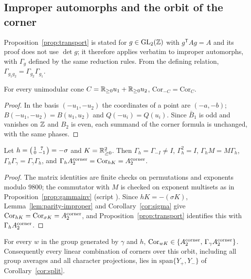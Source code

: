 \subsection{Improper automorphs and the orbit of the corner}\label{sec:improper}
Proposition~\ref{prop:transport} is stated for $g\in\mathrm{GL}_2(\mathbb{Z})$ with $g^{\mathsf T}Ag=A$ and its proof does not use $\det g$; it therefore applies verbatim to improper automorphs, with
$\Gamma_g$ defined by the same reduction rules. From the defining relation, $\Gamma_{g_1g_2}=\Gamma_{g_2}\Gamma_{g_1}$.
\begin{lemma}\label{lem:parity-improper}
For every unimodular cone $C=\mathbb{R}_{\ge0}u_1+\mathbb{R}_{\ge0}u_2$, $\mathrm{Cor}_{-C}=\mathrm{Cor}_C$.
\end{lemma}
\begin{proof}
In the basis $(-u_1,-u_2)$ the coordinates of a point are $(-a,-b)$; $B(-u_1,-u_2)=B(u_1,u_2)$ and $Q(-u_i)=Q(u_i)$. Since $\bar B_1$ is odd and vanishes on $\mathbb{Z}$ and $B_2$ is even, each
summand of the corner formula is unchanged, with the same phases.
\end{proof}
\begin{proposition}\label{prop:improper}
Let $h=\begin{psmallmatrix}1&7\\0&-1\end{psmallmatrix}=-\sigma$ and $K=\mathbb{R}_{\ge0}^2$. Then $\Gamma_h=\Gamma_{-I}\neq I$, $\Gamma_h^2=I$, $\Gamma_hM=M\Gamma_h$, $\Gamma_h\Gamma_\gamma=\Gamma_\gamma\Gamma_h$, and
$\Gamma_h A_2^{\rm corner}=\mathrm{Cor}_{hK}=A_2^{\rm corner}$.
\end{proposition}
\begin{proof}
The matrix identities are finite checks on permutations and exponents modulo $9800$; the commutator with $M$ is checked on exponent multisets as in Proposition~\ref{prop:gammainv}
(script ). Since $hK=-(\sigma K)$, Lemma~\ref{lem:parity-improper} and Corollary~\ref{cor:sigma} give $\mathrm{Cor}_{hK}=\mathrm{Cor}_{\sigma K}=A_2^{\rm corner}$, and
Proposition~\ref{prop:transport} identifies this with $\Gamma_hA_2^{\rm corner}$.
\end{proof}
\begin{corollary}\label{cor:orbit}
For every $w$ in the group generated by $\gamma$ and $h$, $\mathrm{Cor}_{wK}\in\{A_2^{\rm corner},\,\Gamma_\gamma A_2^{\rm corner}\}$. Consequently every linear combination of corners over this
orbit, including all group averages and all character projections, lies in $\mathrm{span}\{Y_+,Y_-\}$ of Corollary~\ref{cor:split}.
\end{corollary}
